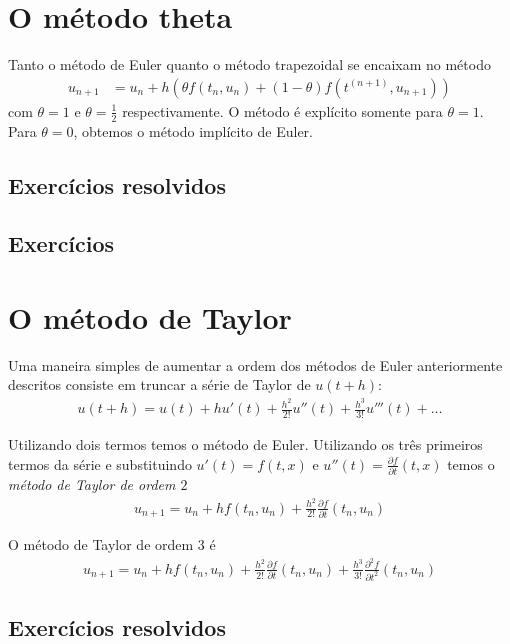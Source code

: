 \section{O método theta}
Tanto o método de Euler quanto o método trapezoidal se encaixam no método
\begin{eqnarray}
  u_{n+1} &= u_n +  h (\theta f(t_n,u_n)+(1-\theta )f(t^{(n+1)},u_{n+1}))
\end{eqnarray}
com $\theta =1$ e $\theta =\frac{1}{2}$ respectivamente. O método é explícito somente para $\theta =1$. Para $\theta =0$, obtemos o método implícito de Euler.

\subsection*{Exercícios resolvidos}

\emconstrucao

\subsection*{Exercícios}

\emconstrucao


\section{O método de Taylor}
Uma maneira simples de aumentar a ordem dos métodos de Euler anteriormente descritos consiste em truncar a série de Taylor de $u(t+h)$:
\begin{eqnarray}
 u(t+h)=u(t) +h u'(t)+ \frac{h^2}{2!}u''(t)+\frac{h^3}{3!}u'''(t)+\ldots
\end{eqnarray}

Utilizando dois termos temos o método de Euler. Utilizando os três primeiros termos da série e substituindo $u'(t)=f(t,x)$ e $u''(t)=\frac{\partial f}{\partial t}(t,x)$ temos o \emph{método de Taylor de ordem $2$}
\begin{eqnarray}
   u_{n+1}=u_n +h f(t_n,u_n)+ \frac{h^2}{2!} \frac{\partial f}{\partial t}(t_n,u_n)
\end{eqnarray}


O método de Taylor de ordem $3$ é
\begin{eqnarray*}
   u_{n+1}=u_n +h f(t_n,u_n)+ \frac{h^2}{2!}\frac{\partial f}{\partial t}(t_n,u_n)+\frac{h^3}{3!}\frac{\partial^2 f}{\partial t^2}(t_n,u_n)
\end{eqnarray*}

\subsection*{Exercícios resolvidos}

